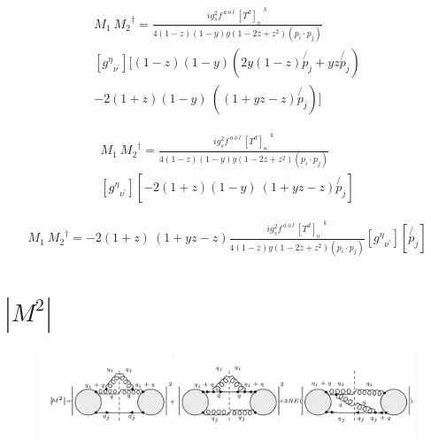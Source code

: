 \begin{equation}
\begin{split}
M_1\:{M_2}^{\dagger}=\frac{ig_s ^2 f^{\:a\:o\:l}\: {[T^d]_{o\:^{\prime}}}^k}{4(1-z)(1-y)y(1-2z+z^2)(p_i \cdot p_j)}\\
[{g^{{\eta}}}_{{\nu}^{\prime}}][(1-z)(1-y) (2y(1-z)\not{p_j}+yz\not{p_j})\\
-2(1+z)(1-y)\:((1+yz-z)\not{p_j})]
\end{split}
\end{equation}

\begin{equation}
\begin{split}
M_1\:{M_2}^{\dagger}=\frac{ig_s ^2 f^{\:a\:o\:l}\: {[T^d]_{o\:^{\prime}}}^k}{4(1-z)(1-y)y(1-2z+z^2)(p_i \cdot p_j)}\\
[{g^{{\eta}}}_{{\nu}^{\prime}}][-2(1+z)(1-y)\:(1+yz-z)\not{p_j}]
\end{split}
\end{equation}

\begin{equation}
\begin{split}
M_1\:{M_2}^{\dagger}=-2(1+z)\:(1+yz-z)\frac{ig_s ^2 f^{\:a\:o\:l}\: {[T^d]_{o\:^{\prime}}}^k}{4(1-z)y(1-2z+z^2)(p_i \cdot p_j)}
[{g^{{\eta}}}_{{\nu}^{\prime}}][\not{p_j}]
\end{split}
\end{equation}


\pagebreak

\section{$|M^{2}|$}
\begin{figure}[ht!]
\centering
\includegraphics[width=1.0\textwidth]{images/ggq-MSquerRE.png}

\end{figure}
